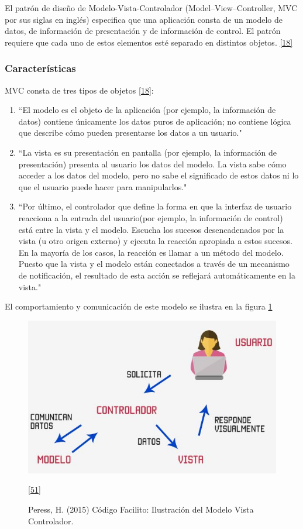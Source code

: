 El patrón de diseño de Modelo-Vista-Controlador (Model–View–Controller, MVC por sus siglas en inglés) especifica que una aplicación consta de un modelo de datos, de información de presentación y de información de control. El patrón requiere que cada uno de estos elementos esté separado en distintos objetos. \hyperlink{b18}{[18]}

\subsubsection{Características}
MVC consta de tres tipos de objetos \hyperlink{b18}{[18]}: 
\begin{enumerate}
\item ``El modelo es el objeto de la aplicación (por ejemplo, la información de datos) contiene únicamente los datos puros de aplicación; no contiene lógica que describe cómo pueden presentarse los datos a un usuario."
\item ``La vista es su presentación en pantalla  (por ejemplo, la información de presentación) presenta al usuario los datos del modelo. La vista sabe cómo acceder a los datos del modelo, pero no sabe el significado de estos datos ni lo que el usuario puede hacer para manipularlos."
\item ``Por último, el controlador que  define la forma en que la interfaz de usuario reacciona a la entrada del usuario(por ejemplo, la información de control) está entre la vista y el modelo. Escucha los sucesos desencadenados por la vista (u otro origen externo) y ejecuta la reacción apropiada a estos sucesos. En la mayoría de los casos, la reacción es llamar a un método del modelo. Puesto que la vista y el modelo están conectados a través de un mecanismo de notificación, el resultado de esta acción se reflejará automáticamente en la vista."
\end{enumerate}

El comportamiento y comunicación de este modelo se ilustra en la figura \ref{fig:mvc}

\begin{figure}[H]
	\begin{center}
		\includegraphics[width=.75\textwidth]{images/marcoteorico/mvc}
		\caption{Peress, H. (2015) Código Facilito: Ilustración del Modelo Vista Controlador.}
		\hyperlink{b51}{[51]} 
		\label{fig:mvc}
	\end{center}
\end{figure}

